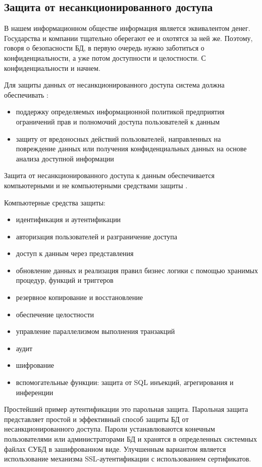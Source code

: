 \subsection{Защита от несанкционированного доступа}

В нашем информационном обществе информация является эквивалентом денег. Государства и компании тщательно оберегают ее и охотятся за ней же. Поэтому, говоря о безопасности БД, в первую очередь нужно заботиться о конфиденциальности, а уже потом доступности и целостности. С конфиденциальности и начнем.

Для защиты данных от несанкционированного доступа система должна обеспечивать \autocite[с. 11]{Skakun}:
\begin{itemize}
	\item поддержку определяемых информационной политикой предприятия ограничений прав и полномочий доступа пользователей к данным
	\item защиту от вредоносных действий пользователей, направленных на повреждение данных или получения конфиденциальных данных на основе анализа доступной информации
\end{itemize}

Защита от несанкционированного доступа к данным обеспечивается компьютерными и не компьютерными средствами защиты \autocite[сс. 12-14]{Skakun}.

Компьютерные средства защиты:
\begin{itemize}
	\item идентификация и аутентификации
	\item авторизация пользователей и разграничение доступа
	\item доступ к данным через представления
	\item обновление данных и реализация правил бизнес логики с помощью хранимых процедур, функций и триггеров
	\item резервное копирование и восстановление
	\item обеспечение целостности
	\item управление параллелизмом выполнения транзакций
	\item аудит
	\item шифрование
	\item вспомогательные функции: защита от SQL инъекций, агрегирования и инференции
\end{itemize}

Простейший пример аутентификации это парольная защита. Парольная защита представляет простой и эффективный способ защиты БД от несанкционированного доступа. Пароли устанавлюваются конечным пользователями или администраторами БД и хранятся в определенных системных файлах СУБД в зашифрованном виде. Улучшенным вариантом является использование механизма SSL-аутентификации с использованием сертификатов.


